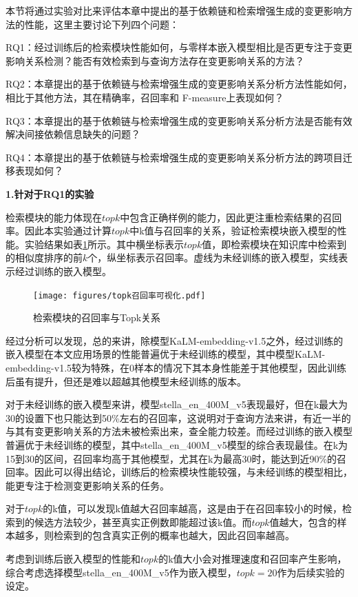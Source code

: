 本节将通过实验对比来评估本章中提出的基于依赖链和检索增强生成的变更影响方法的性能，这里主要讨论下列四个问题：

RQ1：经过训练后的检索模块性能如何，与零样本嵌入模型相比是否更专注于变更影响关系检测？能否有效检索到与查询方法存在变更影响关系的方法？

RQ2：本章提出的基于依赖链与检索增强生成的变更影响关系分析方法性能如何，相比于其他方法，其在精确率，召回率和 F-measure上表现如何？

RQ3：本章提出的基于依赖链与检索增强生成的变更影响关系分析方法是否能有效解决间接依赖信息缺失的问题？

RQ4：本章提出的基于依赖链与检索增强生成的变更影响关系分析方法的跨项目迁移表现如何？
 

\textbf{1.针对于RQ1的实验}

检索模块的能力体现在$topk$中包含正确样例的能力，因此更注重检索结果的召回率。因此本实验通过计算$topk$中k值与召回率的关系，验证检索模块嵌入模型的性能。实验结果如表\ref{1_检索模块的召回率与Topk的关系可视化}所示。其中横坐标表示$topk$值，即检索模块在知识库中检索到的相似度排序的前$k$个，纵坐标表示召回率。虚线为未经训练的嵌入模型，实线表示经过训练的嵌入模型。

\begin{figure}[htbp]
\centering
\texttt{[image: figures/topk召回率可视化.pdf]}
\caption{检索模块的召回率与Topk关系}
\label{1_检索模块的召回率与Topk的关系可视化}
\end{figure}

经过分析可以发现，总的来讲，除模型KaLM-embedding-v1.5之外，经过训练的嵌入模型在本文应用场景的性能普遍优于未经训练的模型，其中模型KaLM-embedding-v1.5较为特殊，在0样本的情况下其本身性能差于其他模型，因此训练后虽有提升，但还是难以超越其他模型未经训练的版本。

对于未经训练的嵌入模型来讲，模型stella\_en\_400M\_v5表现最好，但在k最大为30的设置下也只能达到50\%左右的召回率，这说明对于查询方法来讲，有近一半的与其有变更影响关系的方法未被检索出来，查全能力较差。而经过训练的嵌入模型普遍优于未经训练的模型，其中stella\_en\_400M\_v5模型的综合表现最佳。在k为15到30的区间，召回率均高于其他模型，尤其在k为最高30时，能达到近90\%的召回率。因此可以得出结论，训练后的检索模块性能较强，与未经训练的模型相比，能更专注于检测变更影响关系的任务。

对于$topk$的k值，可以发现k值越大召回率越高，这是由于在召回率较小的时候，检索到的候选方法较少，甚至真实正例数即能超过该k值。而$topk$值越大，包含的样本越多，则检索到的包含真实正例的概率也越大，因此召回率越高。


考虑到训练后嵌入模型的性能和$topk$的k值大小会对推理速度和召回率产生影响，综合考虑选择模型stella\_en\_400M\_v5作为嵌入模型，$topk=20$作为后续实验的设定。 

